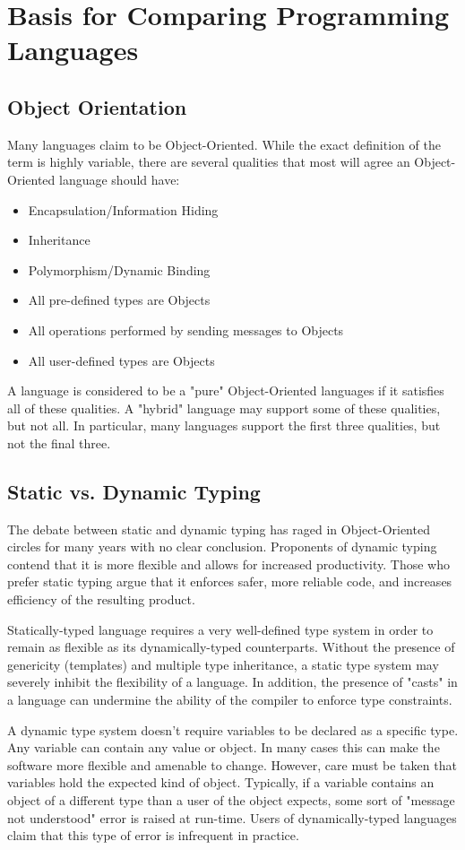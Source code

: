 \documentclass[12pt,a4paper,final,twoside,onecolumn,titlepage]{book}
\begin{document}
\section{Basis for Comparing Programming Languages}
\subsection{Object Orientation}
Many languages claim to be Object-Oriented. While the exact definition of the term is highly variable, there are several qualities that most will agree an Object-Oriented language should have:
\begin{itemize}
\item Encapsulation/Information Hiding
\item Inheritance
\item Polymorphism/Dynamic Binding
\item All pre-defined types are Objects
\item All operations performed by sending messages to Objects
\item All user-defined types are Objects
\end{itemize}
A language is considered to be a "pure" Object-Oriented languages if it satisfies all of these qualities. A "hybrid" language may support some of these qualities, but not all. In particular, many languages support the first three qualities, but not the final three.

\subsection{Static vs. Dynamic Typing}
The debate between static and dynamic typing has raged in Object-Oriented circles for many years with no clear conclusion. Proponents of dynamic typing contend that it is more flexible and allows for increased productivity. Those who prefer static typing argue that it enforces safer, more reliable code, and increases efficiency of the resulting product.

Statically-typed language requires a very well-defined type system in order to remain as flexible as its dynamically-typed counterparts. Without the presence of genericity (templates) and multiple type inheritance, a static type system may severely inhibit the flexibility of a language. In addition, the presence of "casts" in a language can undermine the ability of the compiler to enforce type constraints.

A dynamic type system doesn't require variables to be declared as a specific type. Any variable can contain any value or object. In many cases this can make the software more flexible and amenable to change. However, care must be taken that variables hold the expected kind of object. Typically, if a variable contains an object of a different type than a user of the object expects, some sort of "message not understood" error is raised at run-time. Users of dynamically-typed languages claim that this type of error is infrequent in practice.
\end{document}

